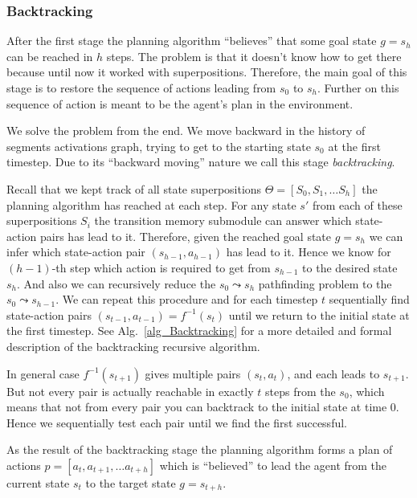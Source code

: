 \documentclass[a4paper,twoside]{article}
\begin{document}
\subsubsection{Backtracking}

After the first stage the planning algorithm ``believes'' that some goal state $g = s_h$ can be reached in $h$ steps. The problem is that it doesn't know how to get there because until now it worked with superpositions. Therefore, the main goal of this stage is to restore the sequence of actions leading from $s_0$ to $s_h$. Further on this sequence of action is meant to be the agent's plan in the environment.

We solve the problem from the end. We move backward in the history of segments activations graph, trying to get to the starting state $s_0$ at the first timestep. Due to its ``backward moving'' nature we call this stage \textit{backtracking}.

Recall that we kept track of all state superpositions $\Theta = [S_0, S_1, \dots S_h]$ the planning algorithm has reached at each step. For any state $s'$ from each of these superpositions $S_i$ the transition memory submodule can answer which state-action pairs has lead to it. Therefore, given the reached goal state $g = s_h$ we can infer which state-action pair $(s_{h-1}, a_{h-1})$ has lead to it. Hence we know for $(h-1)$-th step which action is required to get from $s_{h-1}$ to the desired state $s_h$. And also we can recursively reduce the $s_0 \leadsto s_h$ pathfinding problem to the  $s_0 \leadsto s_{h-1}$. We can repeat this procedure and for each timestep $t$ sequentially find state-action pairs $(s_{t-1}, a_{t-1}) = f^{-1}(s_t)$ until we return to the initial state at the first timestep. See Alg.~\ref{alg_Backtracking} for a more detailed and formal description of the backtracking recursive algorithm.

In general case $f^{-1}(s_{t+1})$ gives multiple pairs $(s_t, a_t)$, and each leads to $s_{t+1}$. But not every pair is actually reachable in exactly $t$ steps from the $s_0$, which means that not from every pair you can backtrack to the initial state at time $0$. Hence we sequentially test each pair until we find the first successful.

As the result of the backtracking stage the planning algorithm forms a plan of actions $p = [a_t, a_{t+1}, \dots a_{t+h}]$ which is ``believed'' to lead the agent from the current state $s_t$ to the target state $g = s_{t+h}$.
\end{document}
